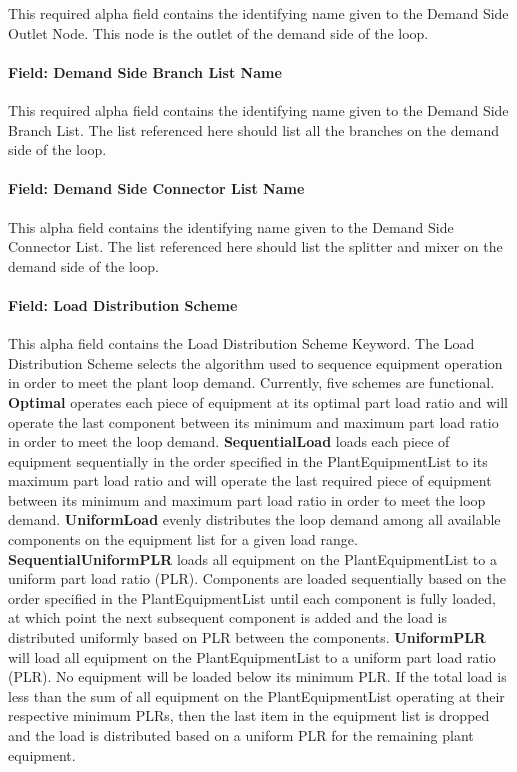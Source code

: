 This required alpha field contains the identifying name given to the Demand Side Outlet Node. This node is the outlet of the demand side of the loop.

\paragraph{Field: Demand Side Branch List Name}\label{field-demand-side-branch-list-name}

This required alpha field contains the identifying name given to the Demand Side Branch List. The list referenced here should list all the branches on the demand side of the loop.

\paragraph{Field: Demand Side Connector List Name}\label{field-demand-side-connector-list-name}

This alpha field contains the identifying name given to the Demand Side Connector List. The list referenced here should list the splitter and mixer on the demand side of the loop.

\paragraph{Field: Load Distribution Scheme}\label{field-load-distribution-scheme-000}

This alpha field contains the Load Distribution Scheme Keyword. The Load Distribution Scheme selects the algorithm used to sequence equipment operation in order to meet the plant loop demand. Currently, five schemes are functional. \textbf{Optimal} operates each piece of equipment at its optimal part load ratio and will operate the last component between its minimum and maximum part load ratio in order to meet the loop demand. \textbf{SequentialLoad} loads each piece of equipment sequentially in the order specified in the PlantEquipmentList to its maximum part load ratio and will operate the last required piece of equipment between its minimum and maximum part load ratio in order to meet the loop demand. \textbf{UniformLoad} evenly distributes the loop demand among all available components on the equipment list for a given load range. \textbf{SequentialUniformPLR} loads all equipment on the PlantEquipmentList to a uniform part load ratio (PLR). Components are loaded sequentially based on the order specified in the PlantEquipmentList until each component is fully loaded, at which point the next subsequent component is added and the load is distributed uniformly based on PLR between the components. \textbf{UniformPLR} will load all equipment on the PlantEquipmentList to a uniform part load ratio (PLR). No equipment will be loaded below its minimum PLR. If the total load is less than the sum of all equipment on the PlantEquipmentList operating at their respective minimum PLRs, then the last item in the equipment list is dropped and the load is distributed based on a uniform PLR for the remaining plant equipment.

